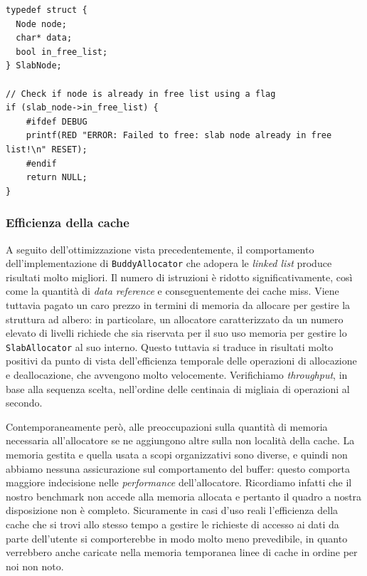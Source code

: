 \begin{lstlisting}
typedef struct {
  Node node;
  char* data;
  bool in_free_list;
} SlabNode;

// Check if node is already in free list using a flag
if (slab_node->in_free_list) {
    #ifdef DEBUG
    printf(RED "ERROR: Failed to free: slab node already in free list!\n" RESET);
    #endif
    return NULL;
}
\end{lstlisting}

\subsubsection{Efficienza della cache}

A seguito dell'ottimizzazione vista precedentemente, il comportamento dell'implementazione di \texttt{BuddyAllocator} che adopera le \textit{linked list} produce risultati molto migliori. Il numero di istruzioni è ridotto significativamente, così come la quantità di \textit{data reference} e conseguentemente dei cache miss. Viene tuttavia pagato un caro prezzo in termini di memoria da allocare per gestire la struttura ad albero: in particolare, un allocatore caratterizzato da un numero elevato di livelli richiede che sia riservata per il suo uso memoria per gestire lo \texttt{SlabAllocator} al suo interno. Questo tuttavia si traduce in risultati molto positivi da punto di vista dell'efficienza temporale delle operazioni di allocazione e deallocazione, che avvengono molto velocemente. Verifichiamo \textit{throughput}, in base alla sequenza scelta, nell'ordine delle centinaia di migliaia di operazioni al secondo. 

Contemporaneamente però, alle preoccupazioni sulla quantità di memoria necessaria all'allocatore se ne aggiungono altre sulla non località della cache. La memoria gestita e quella usata a scopi organizzativi sono diverse, e quindi non abbiamo nessuna assicurazione sul comportamento del buffer: questo comporta maggiore indecisione nelle \textit{performance} dell'allocatore. Ricordiamo infatti che il nostro benchmark non accede alla memoria allocata e pertanto il quadro a nostra disposizione non è completo. Sicuramente in casi d'uso reali l'efficienza della cache che si trovi allo stesso tempo a gestire le richieste di accesso ai dati da parte dell'utente si comporterebbe in modo molto meno prevedibile, in quanto verrebbero anche caricate nella memoria temporanea linee di cache in ordine per noi non noto. 

